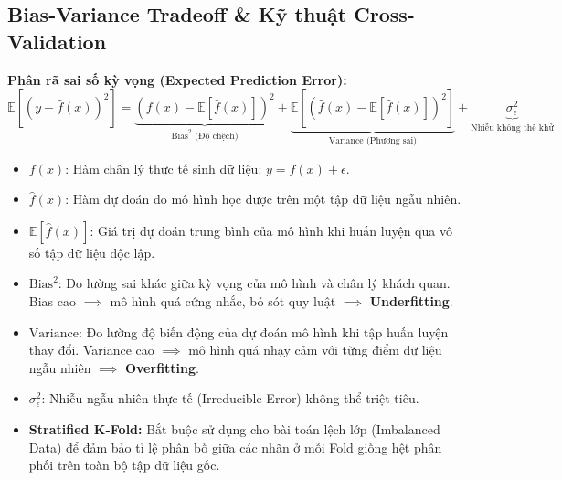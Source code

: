 \documentclass[10pt,a4paper]{article}
\begin{document}
\subsection{Bias-Variance Tradeoff \& Kỹ thuật Cross-Validation}
\textbf{Phân rã sai số kỳ vọng (Expected Prediction Error):}
\begin{equation}
    \mathbb{E}[(y - \hat{f}(x))^2] = \underbrace{\left( f(x) - \mathbb{E}[\hat{f}(x)] \right)^2}_{\text{Bias}^2 \text{ (Độ chệch)}} + \underbrace{\mathbb{E}\left[ (\hat{f}(x) - \mathbb{E}[\hat{f}(x)])^2 \right]}_{\text{Variance (Phương sai)}} + \underbrace{\sigma_\epsilon^2}_{\text{Nhiễu không thể khử}}
\end{equation}
\begin{itemize}[leftmargin=*]
    \item $f(x)$: Hàm chân lý thực tế sinh dữ liệu: $y = f(x) + \epsilon$.
    \item $\hat{f}(x)$: Hàm dự đoán do mô hình học được trên một tập dữ liệu ngẫu nhiên.
    \item $\mathbb{E}[\hat{f}(x)]$: Giá trị dự đoán trung bình của mô hình khi huấn luyện qua vô số tập dữ liệu độc lập.
    \item $\text{Bias}^2$: Đo lường sai khác giữa kỳ vọng của mô hình và chân lý khách quan. Bias cao $\implies$ mô hình quá cứng nhắc, bỏ sót quy luật $\implies$ \textbf{Underfitting}.
    \item $\text{Variance}$: Đo lường độ biến động của dự đoán mô hình khi tập huấn luyện thay đổi. Variance cao $\implies$ mô hình quá nhạy cảm với từng điểm dữ liệu ngẫu nhiên $\implies$ \textbf{Overfitting}.
    \item $\sigma_\epsilon^2$: Nhiễu ngẫu nhiên thực tế (Irreducible Error) không thể triệt tiêu.
    \item \textbf{Stratified K-Fold:} Bắt buộc sử dụng cho bài toán lệch lớp (Imbalanced Data) để đảm bảo tỉ lệ phân bố giữa các nhãn ở mỗi Fold giống hệt phân phối trên toàn bộ tập dữ liệu gốc.
\end{itemize}
\end{document}
